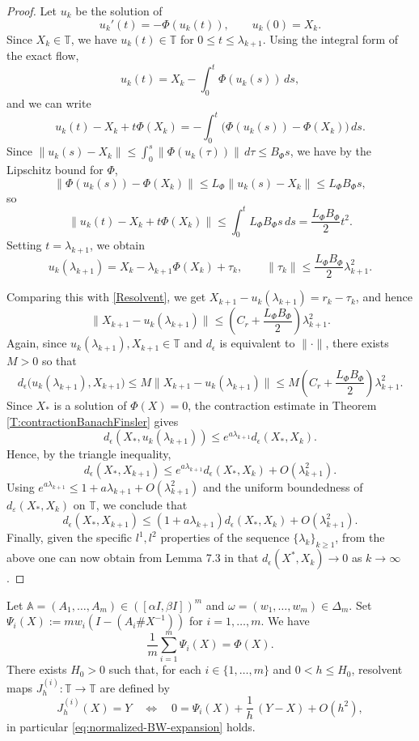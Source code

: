 \documentclass[12pt,reqno]{amsart}
\begin{document}
\begin{proof}
Let \(u_k\) be the solution of
\[
u_k'(t) = -\Phi(u_k(t)), \qquad u_k(0) = X_k.
\]
Since \( X_k \in \mathbb{T} \),
we have $u_k(t) \in \mathbb{T}$ for $0 \le t \le \lambda_{k+1}$.
Using the integral form of the exact flow,
\[
u_k(t) = X_k - \int_0^t \Phi(u_k(s)) \, ds,
\]
and we can write
\[
u_k(t) - X_k + t \Phi(X_k)
=
-\int_0^t \bigl( \Phi(u_k(s)) - \Phi(X_k) \bigr) \, ds.
\]
Since
$\displaystyle \| u_k(s) - X_k \|
\le \int_0^s \| \Phi(u_k(\tau)) \| \, d\tau
\le B_\Phi s$,
we have by the Lipschitz bound for \(\Phi\),
\[
\| \Phi(u_k(s))-\Phi(X_k) \|
\le
L_\Phi \| u_k(s)-X_k \|
\le
L_\Phi B_\Phi s,
\]
so
\[
\| u_k(t) - X_k + t \Phi(X_k) \|
\le \int_0^t L_\Phi B_\Phi s \, ds
= \frac{L_\Phi B_\Phi}{2} t^2.
\]
Setting \( t = \lambda_{k+1} \), we obtain
\[
u_k(\lambda_{k+1})
= X_k - \lambda_{k+1} \Phi(X_k) + \tau_k,
\qquad
\| \tau_k \| \le \frac{L_\Phi B_\Phi}{2} \lambda_{k+1}^2.
\]

Comparing this with \eqref{Resolvent},
we get $X_{k+1} - u_k(\lambda_{k+1}) = r_k - \tau_k$,
and hence
\[
\| X_{k+1} - u_k(\lambda_{k+1}) \|
\le
\left( C_r + \frac{L_\Phi B_\Phi}{2} \right) \lambda_{k+1}^2.
\]
Again, since \( u_k(\lambda_{k+1}), X_{k+1} \in \mathbb{T} \) and $d_{\epsilon}$ is equivalent to $\| \cdot \|$, there exists $M > 0$ so that
\[
d_\epsilon \bigl( u_k(\lambda_{k+1}), X_{k+1} \bigr)
\le
M \| X_{k+1} - u_k(\lambda_{k+1}) \|
\le
M \left( C_r + \frac{L_\Phi B_\Phi}{2} \right) \lambda_{k+1}^2.
\]
Since \(X_*\) is a solution of $\Phi(X) = 0$, the contraction estimate in Theorem \ref{T:contractionBanachFinsler} gives
\[
d_\epsilon(X_*,u_k(\lambda_{k+1})) \le e^{a \lambda_{k+1}} d_\epsilon(X_*,X_k).
\]
Hence, by the triangle inequality,
\[
d_\epsilon(X_*,X_{k+1})
\le e^{a \lambda_{k+1}} d_\epsilon(X_*,X_k) + O(\lambda_{k+1}^2).
\]
Using $e^{a \lambda_{k+1}} \le 1 + a \lambda_{k+1} + O(\lambda_{k+1}^2)$
and the uniform boundedness of \(d_\varepsilon(X_*,X_k)\) on \( \mathbb{T} \),
we conclude that
\[
d_\epsilon(X_*,X_{k+1})
\le
(1 + a \lambda_{k+1}) d_\epsilon(X_*,X_k) + O(\lambda_{k+1}^2).
\]
Finally, given the specific ${l}^1,{l}^2$ properties of the sequence $\{\lambda_k\}_{k \ge 1}$, from the above one can now obtain from Lemma 7.3 in \cite{HallHeyde} that $d_\epsilon(X^*,X_{k}) \to 0$ as $k \to \infty$.
\end{proof}

Let $\mathbb A = (A_1, \dots, A_m) \in ([\alpha I,\beta I])^m$ and $\omega = (w_1, \dots, w_m) \in \Delta_m$.
Set $\Psi_i(X) := m w_i(I - (A_i \# X^{-1}))$ for $i=1,\dots,m$.
We have
\[
\frac{1}{m} \sum_{i=1}^m \Psi_i(X) = \Phi(X).
\]
There exists \(H_0 > 0\) such that, for each \( i \in \{ 1, \dots, m \} \) and
\( 0 < h \le H_0 \), resolvent maps
\( J_h^{(i)}: \mathbb{T} \to \mathbb{T} \) are defined by
\begin{equation}\label{eq:def-normalized-resolvent-i}
J_h^{(i)}(X) = Y
\quad \Longleftrightarrow \quad
0 = \Psi_i(X) + \frac1h \, (Y-X) + O(h^2),
\end{equation}
in particular \eqref{eq:normalized-BW-expansion} holds.
\end{document}
